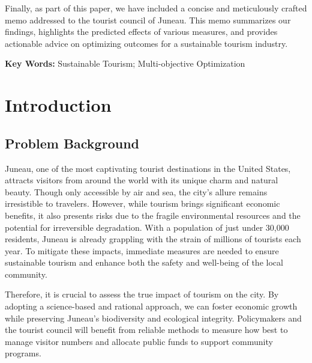 \documentclass[UTF8]{mcmthesis}
\begin{document}
\begin{summary}
        Finally, as part of this paper, we have included a concise and meticulously crafted memo addressed to the tourist council of Juneau. This memo summarizes our findings, highlights the predicted effects of various measures, and provides actionable advice on optimizing outcomes for a sustainable tourism industry.
        

    
        \vspace{2em}
        \noindent\textbf{Key Words: } Sustainable Tourism; Multi-objective Optimization  
    \end{summary}

    \maketitle
    \tableofcontents

    \setcounter{page}{1}
    \section{Introduction}
        \subsection{Problem Background}
            \hspace*{2em}Juneau, one of the most captivating tourist destinations in the United States, attracts visitors from around the world with its unique charm and natural beauty. Though only accessible by air and sea, the city’s allure remains irresistible to travelers.
            However, while tourism brings significant economic benefits, it also presents risks due to the fragile environmental resources and the potential for irreversible degradation. With a population of just under 30,000 residents, Juneau is already grappling with the strain of millions of tourists each year. To mitigate these impacts, immediate measures are needed to ensure sustainable tourism and enhance both the safety and well-being of the local community.
            
            Therefore, it is crucial to assess the true impact of tourism on the city. By adopting a science-based and rational approach, we can foster economic growth while preserving Juneau’s biodiversity and ecological integrity. Policymakers and the tourist council will benefit from reliable methods to measure how best to manage visitor numbers and allocate public funds to support community programs.
            
\end{document}
